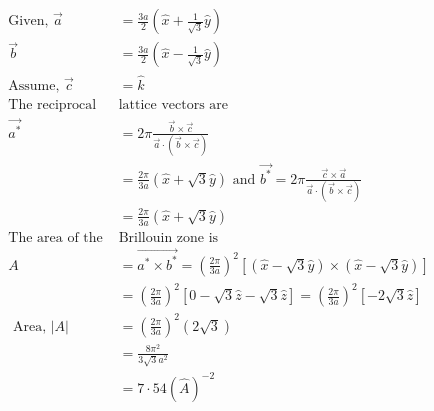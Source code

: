 \begin{answer}
	\begin{align*}
	\text{Given, } \vec{a}&=\frac{3 a}{2}\left(\hat{x}+\frac{1}{\sqrt{3}} \hat{y}\right) \\ \vec{b}&=\frac{3 a}{2}\left(\hat{x}-\frac{1}{\sqrt{3}} \hat{y}\right)\\
	\text{Assume, }\vec{c}&=\hat{k}\\
	\text{The reciprocal }&\text{lattice vectors are}\\
	\overrightarrow{a^{*}}&=2 \pi \frac{\vec{b} \times \vec{c}}{\vec{a} \cdot(\vec{b} \times \vec{c})}\\&=\frac{2 \pi}{3 a}(\hat{x}+\sqrt{3} \hat{y}) \text { and } \overrightarrow{b^{*}}=2 \pi \frac{\vec{c} \times \vec{a}}{\vec{a} \cdot(\vec{b} \times \vec{c})}\\&=\frac{2 \pi}{3 a}(\hat{x}+\sqrt{3} \hat{y})\\
	\text{The area of the }&\text{Brillouin zone is}\\
	A&=\overrightarrow{a^{*} \times b^{*}}=\left(\frac{2 \pi}{3 a}\right)^{2}[(\hat{x}-\sqrt{3} \hat{y}) \times(\hat{x}-\sqrt{3} \hat{y})] \\
	&=\left(\frac{2 \pi}{3 a}\right)^{2}[0-\sqrt{3} \hat{z}-\sqrt{3} \hat{z}]=\left(\frac{2 \pi}{3 a}\right)^{2}[-2 \sqrt{3} \hat{z}] \\
	\text { Area, }|A|&=\left(\frac{2 \pi}{3 a}\right)^{2}(2 \sqrt{3})\\&=\frac{8 \pi^{2}}{3 \sqrt{3} a^{2}}\\&=7 \cdot 54(\hat{A})^{-2}
	\end{align*}
\end{answer}


